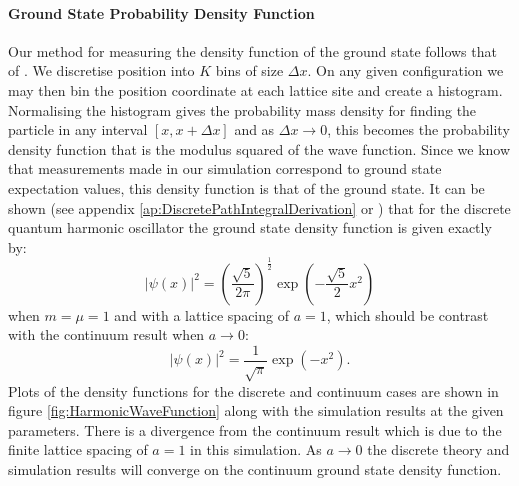 \documentclass[12pt]{article}
\begin{document}
            \paragraph{Ground State Probability Density Function}
            Our method for measuring the density function of the ground state follows that of \cite{creutz_freedman_1981}. We discretise position into $K$ bins of size $\Delta x$. On any given configuration we may then bin the position coordinate at each lattice site and create a histogram. Normalising the histogram gives the probability mass density for finding the particle in any interval $\left[x,x+\Delta x\right]$ and as $\Delta x \rightarrow 0$, this becomes the probability density function that is the modulus squared of the wave function. Since we know that measurements made in our simulation correspond to ground state expectation values, this density function is that of the ground state. It can be shown (see appendix \ref{ap:DiscretePathIntegralDerivation} or \cite{creutz_freedman_1981}) that for the discrete quantum harmonic oscillator the ground state density function is given exactly by:
            \begin{equation}
                \label{eq:magSquaredWavefunction}
                |\psi\left(x\right)|^2=\left(\frac{\sqrt{5}}{2\pi}\right)^\frac{1}{2}\exp\left(-\frac{\sqrt{5}}{2}x^2\right)
            \end{equation}
            when $m=\mu=1$ and with a lattice spacing of $a=1$, which should be contrast with the continuum result when $a\rightarrow 0$:
            \begin{equation}
            |\psi\left(x\right)|^2 = \frac{1}{\sqrt{\pi}}\exp{\left(-x^2\right)}.
            \end{equation}
            Plots of the density functions for the discrete and continuum cases are shown in figure \ref{fig:HarmonicWaveFunction} along with the simulation results at the given parameters. There is a divergence from the continuum result which is due to the finite lattice spacing of $a=1$ in this simulation. As $a\rightarrow 0$ the discrete theory and simulation results will converge on the continuum ground state density function.
\end{document}
